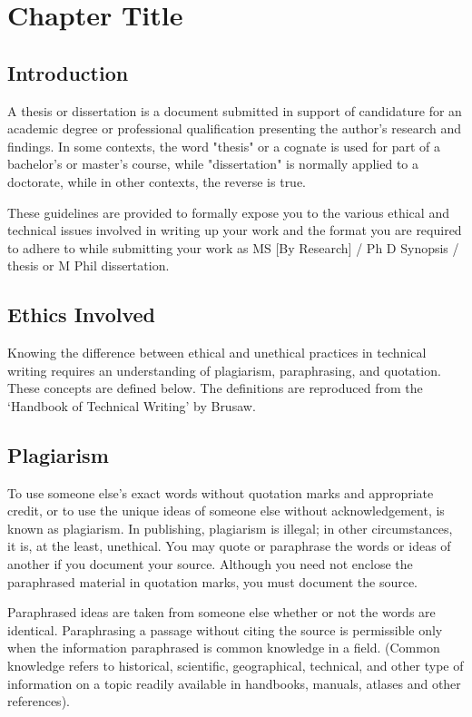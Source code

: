 \chapter{Chapter Title} \label{c1}
\section{Introduction}
A thesis or dissertation is a document submitted in support of candidature for an academic degree or professional qualification presenting the author's research and findings. In some contexts, the word "thesis" or a cognate is used for part of a bachelor's or master's course, while "dissertation" is normally applied to a doctorate, while in other contexts, the reverse is true.
 
These guidelines are provided to formally expose you to the various ethical and technical issues involved in writing up your work and the format you are required to adhere to while submitting your work as MS [By Research] / Ph D Synopsis / thesis or M Phil dissertation. 

\section{Ethics Involved}

Knowing the difference between ethical and unethical practices in technical writing requires an understanding of plagiarism, paraphrasing, and quotation. These concepts are defined below. The definitions are reproduced from the `Handbook of Technical Writing' by Brusaw.

\section{Plagiarism}
To use someone else's exact words without quotation marks and appropriate credit, or to use the unique ideas of someone else without acknowledgement, is known as plagiarism. In publishing, plagiarism is illegal; in other circumstances, it is, at the least, unethical. You may quote or paraphrase the words or ideas of another if you document your source. Although you need not enclose the paraphrased material in quotation marks, you must document the source. 

\newpage

Paraphrased ideas are taken from someone else whether or not the words are identical. Paraphrasing a passage without citing the source is permissible only when the information paraphrased is common knowledge in a field. (Common knowledge refers to historical, scientific, geographical, technical, and other type of information on a topic readily available in handbooks, manuals, atlases and other references). 
